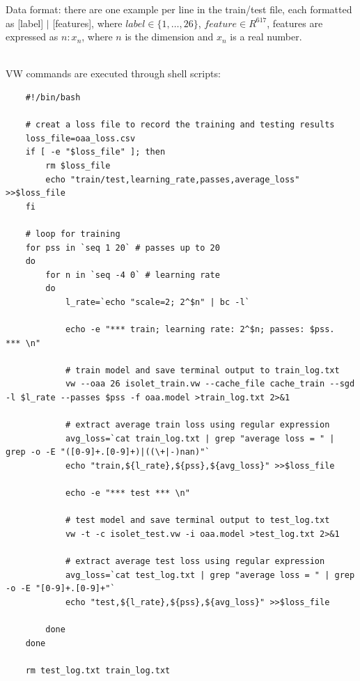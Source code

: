 \documentclass[a4paper,12pt]{article}
\begin{document}
Data format: there are one example per line in the train/test file, each formatted as [label] $|$ [features], where $label \in \{1,\ldots,26\}$, 
$feature \in R^{617}$, features are expressed as $n: x_n$, where $n$ is the dimension and $x_n$ is a real number.

\quad \\
VW commands are executed through shell scripts:
\begin{lstlisting}
    #!/bin/bash

    # creat a loss file to record the training and testing results
    loss_file=oaa_loss.csv
    if [ -e "$loss_file" ]; then
        rm $loss_file
        echo "train/test,learning_rate,passes,average_loss" >>$loss_file
    fi
    
    # loop for training
    for pss in `seq 1 20` # passes up to 20
    do
        for n in `seq -4 0` # learning rate 
        do
            l_rate=`echo "scale=2; 2^$n" | bc -l`
    
            echo -e "*** train; learning rate: 2^$n; passes: $pss.  *** \n"
    
            # train model and save terminal output to train_log.txt
            vw --oaa 26 isolet_train.vw --cache_file cache_train --sgd -l $l_rate --passes $pss -f oaa.model >train_log.txt 2>&1
    
            # extract average train loss using regular expression
            avg_loss=`cat train_log.txt | grep "average loss = " | grep -o -E "([0-9]+.[0-9]+)|((\+|-)nan)"`
            echo "train,${l_rate},${pss},${avg_loss}" >>$loss_file
    
            echo -e "*** test *** \n"
    
            # test model and save terminal output to test_log.txt
            vw -t -c isolet_test.vw -i oaa.model >test_log.txt 2>&1
            
            # extract average test loss using regular expression
            avg_loss=`cat test_log.txt | grep "average loss = " | grep -o -E "[0-9]+.[0-9]+"`
            echo "test,${l_rate},${pss},${avg_loss}" >>$loss_file
    
        done
    done
    
    rm test_log.txt train_log.txt 
\end{lstlisting}
\end{document}
